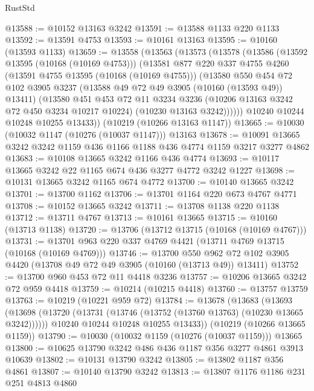 \begin{lexlean}{RustStd}
\begin{coremodule}
@13588 := @10152 @13163 @3242
@13591 := @13588 @1133 @220 @1133
@13592 := @13591 @4753
@13593 := @10161 @13163
@13595 := @10160 (@13593 @1133)
@13659 := @13558
    (@13563
      (@13573
        (@13578
          (@13586
            (@13592 @13595 (@10168 (@10169 @4753)))
            (@13581
              @877
              @220
              @337
              @4755
              @4260
              (@13591 @4755 @13595 (@10168 (@10169 @4755)))
              (@13580
                @550
                @454
                @72
                @102
                @3905
                @3237
                (@13588 @49 @72 @49 @3905 (@10160 (@13593 @49)) @13411)
                (@13580
                  @451
                  @453
                  @72
                  @11
                  @3234
                  @3236
                  (@10206 @13163 @3242 @72 @450 @3234 @10217 @10224)
                  (@10230 @13163 @3242))))))
        @10240
        @10244
        @10248
        @10255
        @13433))
    (@10219 (@10266 @13163 @1147))
@13665 := @10030 (@10032 @1147 (@10276 (@10037 @1147))) @13163
@13678 := @10091 @13665 @3242 @3242 @1159 @436 @1166 @1188 @436 @4774 @1159 @3217 @3277 @4862
@13683 := @10108 @13665 @3242 @1166 @436 @4774
@13693 := @10117 @13665 @3242 @22 @1165 @674 @436 @3277 @4772 @3242 @1227
@13698 := @10131 @13665 @3242 @1165 @674 @4772
@13700 := @10140 @13665 @3242
@13701 := @13700 @1162
@13706 := @13701 @1164 @220 @673 @4767 @4771
@13708 := @10152 @13665 @3242
@13711 := @13708 @1138 @220 @1138
@13712 := @13711 @4767
@13713 := @10161 @13665
@13715 := @10160 (@13713 @1138)
@13720 := @13706 (@13712 @13715 (@10168 (@10169 @4767)))
@13731 := @13701 @963 @220 @337 @4769 @4421 (@13711 @4769 @13715 (@10168 (@10169 @4769)))
@13746 := @13700
    @550
    @962
    @72
    @102
    @3905
    @4420
    (@13708 @49 @72 @49 @3905 (@10160 (@13713 @49)) @13411)
@13752 := @13700 @960 @453 @72 @11 @4418 @3236
@13757 := @10206 @13665 @3242 @72 @959 @4418
@13759 := @10214 (@10215 @4418)
@13760 := @13757 @13759
@13763 := @10219 (@10221 @959 @72)
@13784 := @13678
    (@13683
      (@13693
        (@13698 (@13720 (@13731 (@13746 (@13752 (@13760 @13763) (@10230 @13665 @3242))))))
        @10240
        @10244
        @10248
        @10255
        @13433))
    (@10219 (@10266 @13665 @1159))
@13790 := @10030 (@10032 @1159 (@10276 (@10037 @1159))) @13665
@13800 := @10625 @13790 @3242 @486 @436 @1187 @356 @3277 @4861 @3913 @10639
@13802 := @10131 @13790 @3242
@13805 := @13802 @1187 @356 @4861
@13807 := @10140 @13790 @3242
@13813 := @13807 @1176 @1186 @231 @251 @4813 @4860

\end{coremodule}
\end{lexlean}
